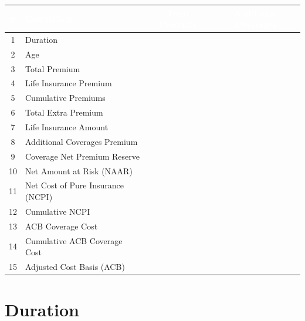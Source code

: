 \documentclass[10pt]{article}
\begin{document}
\begin{table}[h]
\centering
\begin{tabular}{|c|l|c|c|}
\hline
\cellcolor{ForestGreen!70}\textcolor{white}{\textbf{\#}} & \cellcolor{ForestGreen!70}\textcolor{white}{\textbf{Calculation}} & \cellcolor{ForestGreen!70}\textcolor{white}{\textbf{Term Products}} & \cellcolor{ForestGreen!70}\textcolor{white}{\textbf{Additional Coverages}} \\
\hline
1 & Duration & \cellcolor{green!40} & \cellcolor{green!40} \\
\hline
2 & Age & \cellcolor{green!40} & \cellcolor{green!40} \\
\hline
3 & Total Premium & \cellcolor{green!40} & \cellcolor{green!40} \\
\hline
4 & Life Insurance Premium & \cellcolor{green!40} & \cellcolor{gray!35} \\
\hline
5 & Cumulative Premiums & \cellcolor{green!40} & \cellcolor{green!40} \\
\hline
6 & Total Extra Premium & \cellcolor{green!40} & \cellcolor{gray!35} \\
\hline
7 & Life Insurance Amount & \cellcolor{green!40} & \cellcolor{gray!35} \\
\hline
8 & Additional Coverages Premium & \cellcolor{gray!35} & \cellcolor{green!40} \\
\hline
9 & Coverage Net Premium Reserve & \cellcolor{green!40} & \cellcolor{gray!35} \\
\hline
10 & Net Amount at Risk (NAAR) & \cellcolor{green!40} & \cellcolor{gray!35} \\
\hline
11 & Net Cost of Pure Insurance (NCPI) & \cellcolor{green!40} & \cellcolor{gray!35} \\
\hline
12 & Cumulative NCPI & \cellcolor{green!40} & \cellcolor{gray!35} \\
\hline
13 & ACB Coverage Cost & \cellcolor{green!40} & \cellcolor{gray!35} \\
\hline
14 & Cumulative ACB Coverage Cost & \cellcolor{green!40} & \cellcolor{gray!35} \\
\hline
15 & Adjusted Cost Basis (ACB) & \cellcolor{green!40} & \cellcolor{gray!35} \\
\hline
\end{tabular}
\end{table}

\section{Duration}
\end{document}
